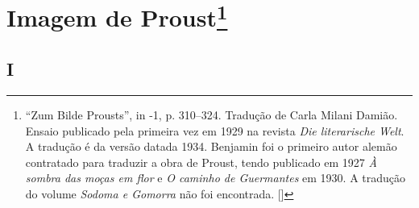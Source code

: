 \chapter{Imagem de Proust\footnote[*]{``Zum Bilde Prousts'', in -1, p. 310--324. Tradução de Carla Milani Damião. Ensaio publicado pela primeira vez em 1929 na revista \emph{Die literarische Welt}. A tradução é da versão datada 1934. Benjamin foi o primeiro autor alemão contratado para traduzir a obra de Proust, tendo publicado em 1927 \emph{À sombra das moças em flor} e \emph{O caminho de Guermantes} em 1930. A tradução do volume \emph{Sodoma e Gomorra} não foi encontrada. []}}

\section{I}


